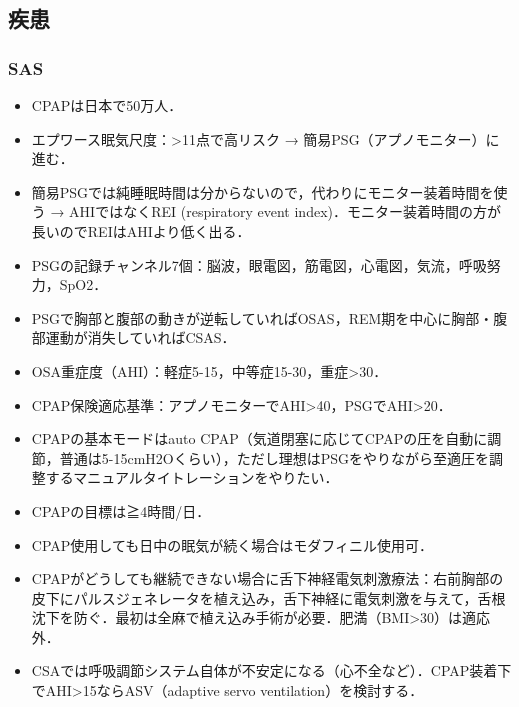 \subsection{疾患}

\subsubsection{SAS}

\begin{itemize}
\item CPAPは日本で50万人．
\item エプワース眠気尺度：>11点で高リスク → 簡易PSG（アプノモニター）に進む．


\item 簡易PSGでは純睡眠時間は分からないので，代わりにモニター装着時間を使う → AHIではなくREI (respiratory event index)．モニター装着時間の方が長いのでREIはAHIより低く出る．
\item PSGの記録チャンネル7個：脳波，眼電図，筋電図，心電図，気流，呼吸努力，SpO2．
\item PSGで胸部と腹部の動きが逆転していればOSAS，REM期を中心に胸部・腹部運動が消失していればCSAS．


\item OSA重症度（AHI）：軽症5-15，中等症15-30，重症>30．
\item CPAP保険適応基準：アプノモニターでAHI>40，PSGでAHI>20．
\item CPAPの基本モードはauto CPAP（気道閉塞に応じてCPAPの圧を自動に調節，普通は5-15cmH2Oくらい），ただし理想はPSGをやりながら至適圧を調整するマニュアルタイトレーションをやりたい．
\item CPAPの目標は≧4時間/日．
\item CPAP使用しても日中の眠気が続く場合はモダフィニル使用可．
\item CPAPがどうしても継続できない場合に舌下神経電気刺激療法：右前胸部の皮下にパルスジェネレータを植え込み，舌下神経に電気刺激を与えて，舌根沈下を防ぐ．最初は全麻で植え込み手術が必要．肥満（BMI>30）は適応外．
\item CSAでは呼吸調節システム自体が不安定になる（心不全など）．CPAP装着下でAHI>15ならASV（adaptive servo ventilation）を検討する．
\end{itemize}


